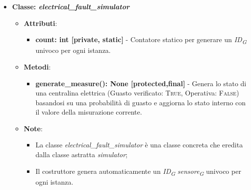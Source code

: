 \begin{itemize}
    \item{\textbf{Classe: \textit{electrical\_fault\_simulator}}}
    \begin{itemize}
        \item \textbf{Attributi}: 
        \begin{itemize}
            \item \textbf{count: int [private, static]} - Contatore statico per generare un \textit{ID}\textsubscript{\textit{G}} univoco per ogni istanza.
        \end{itemize}
        \item \textbf{Metodi}: 
        \begin{itemize}
            \item \textbf{generate\_measure(): None [protected,final]} - Genera lo stato di una centralina elettrica (Guasto verificato: \textsc{True}, Operativa: \textsc{False}) basandosi su una probabilità di guasto e aggiorna lo stato interno con il valore della misurazione corrente.
        \end{itemize}
        \item \textbf{Note}:
        \begin{itemize}
            \item La classe \textit{electrical\_fault\_simulator} è una classe concreta che eredita dalla classe astratta \textit{simulator};
            \item Il costruttore genera automaticamente un \textit{ID}\textsubscript{\textit{G}} \textit{sensore}\textsubscript{\textit{G}} univoco per ogni istanza.
        \end{itemize}
    \end{itemize}


\end{itemize}
